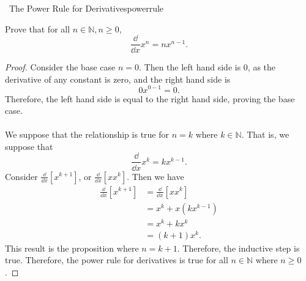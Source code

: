         \begin{exercise}{\Difficulty\,\Difficulty\,\,The Power Rule for Derivatives}{powerrule}
        
            Prove that for all \(n\in\mathbb{N}, n \geq 0\),
            \begin{equation*}
                \frac{\dd}{\dd x}x^n=nx^{n-1}.
            \end{equation*}
            \begin{proof}
                Consider the base case \(n=0\). Then the left hand side is \(0\), as the derivative of any constant is zero, and the right hand side is
                \begin{equation*}
                    0x^{0-1}=0.
                \end{equation*}
                Therefore, the left hand side is equal to the right hand side, proving the base case.
                \\
                \\
                We suppose that the relationship is true for \(n=k\) where \(k\in\mathbb{N}\). That is, we suppose that
                \begin{equation*}
                    \frac{\dd}{\dd x}x^k=kx^{k-1}.
                \end{equation*}
                Consider \(\frac{\dd}{\dd x}[x^{k+1}]\), or \(\frac{\dd}{\dd x}[xx^{k}]\). Then we have
                \begin{align*}
                   \frac{\dd}{\dd x}[x^{k+1}]&=\frac{\dd}{\dd x}[xx^k] \\
                    &=x^k+x(kx^{k-1}) \\
                    &=x^k+kx^k \\
                    &=(k+1)x^k.
                \end{align*}
                This result is the proposition where \(n=k+1\). Therefore, the inductive step is true. Therefore, the power rule for derivatives is true for all \(n\in\mathbb{N}\) where \(n \geq 0\).
            \end{proof}
        
        \end{exercise}
        \pagebreak
